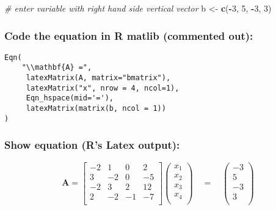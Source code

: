 \documentclass[
  10pt,
  a4paper,
]{article}
\newenvironment{Shaded}{\begin{snugshade}}{\end{snugshade}}
\newcommand{\CommentTok}[1]{\textcolor[rgb]{0.56,0.35,0.01}{\textit{#1}}}
\newcommand{\DecValTok}[1]{\textcolor[rgb]{0.00,0.00,0.81}{#1}}
\newcommand{\FunctionTok}[1]{\textcolor[rgb]{0.13,0.29,0.53}{\textbf{#1}}}
\newcommand{\NormalTok}[1]{#1}
\newcommand{\OtherTok}[1]{\textcolor[rgb]{0.56,0.35,0.01}{#1}}
\newcommand{\SpecialCharTok}[1]{\textcolor[rgb]{0.81,0.36,0.00}{\textbf{#1}}}
\begin{document}
\begin{Shaded}
\begin{Highlighting}[]
\CommentTok{\# enter variable with right hand side vertical vector}
\NormalTok{b }\OtherTok{\textless{}{-}} \FunctionTok{c}\NormalTok{(}\SpecialCharTok{{-}}\DecValTok{3}\NormalTok{, }\DecValTok{5}\NormalTok{, }\SpecialCharTok{{-}}\DecValTok{3}\NormalTok{, }\DecValTok{3}\NormalTok{)}
\end{Highlighting}
\end{Shaded}

\hypertarget{code-the-equation-in-r-matlib-commented-out}{%
\subsubsection{Code the equation in R matlib (commented
out):}\label{code-the-equation-in-r-matlib-commented-out}}

\begin{verbatim}
Eqn(
    "\\mathbf{A} =",
     latexMatrix(A, matrix="bmatrix"),
     latexMatrix("x", nrow = 4, ncol=1),
     Eqn_hspace(mid='='), 
     latexMatrix(matrix(b, ncol = 1))
)
\end{verbatim}

\hypertarget{show-equation-rs-latex-output}{%
\subsubsection{Show equation (R's Latex
output):}\label{show-equation-rs-latex-output}}

\begin{equation*}
\mathbf{A} =\begin{bmatrix} 
-2 &  1 &  0 &  2 \\ 
 3 & -2 &  0 & -5 \\ 
-2 &  3 &  2 & 12 \\ 
 2 & -2 & -1 & -7 \\ 
\end{bmatrix}
\begin{pmatrix} 
  x_{1} \\ 
  x_{2} \\ 
  x_{3} \\ 
  x_{4} \\ 
\end{pmatrix}
\quad=\quad\begin{pmatrix} 
-3 \\ 
 5 \\ 
-3 \\ 
 3 \\ 
\end{pmatrix}
\end{equation*}
\end{document}
